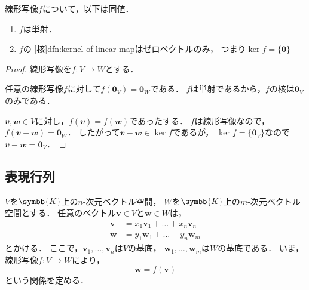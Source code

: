 \documentclass[../sotsu.tex]{subfiles}
\begin{document}
\begin{proposition}
    \label{thm:linear-map-injective}
    線形写像$f$について，以下は同値．
    \begin{enumerate}
        \item $f$は単射．
        \item $f$の-[核]{dfn:kernel-of-linear-map}はゼロベクトルのみ，
            つまり$\ker f = \{ \symbf{0} \}$
    \end{enumerate}
\end{proposition}

\begin{proof}
    線形写像を$f \colon V \to W$とする．

     \quad 
    任意の線形写像$f$に対して$f(\symbf{0}_V) = \symbf{0}_W$である．
    $f$は単射であるから，$f$の核は$\symbf{0}_V$のみである．

     \quad 
    $𝒗, 𝒘 \in V$に対し，$f(𝒗) = f(𝒘)$であったする．
    $f$は線形写像なので，$f(𝒗 - 𝒘) = \symbf{0}_W$．
    したがって$𝒗 - 𝒘 \in \ker f$であるが，
    $\ker f = \{ \symbf{0}_V \}$なので$𝒗 - 𝒘 = \symbf{0}_V$．
\end{proof}



\subsection{表現行列}
\label{representation-matrix}

$V$を$\symbb{K}$上の$n$-次元ベクトル空間，
$W$を$\symbb{K}$上の$m$-次元ベクトル空間とする．
任意のベクトル$\symbf{v} \in V$と$\symbf{w} \in W$は，
\begin{equation*}
    \begin{aligned}
        \symbf{v} &= x_1 \symbf{v}_1 + \dots + x_n \symbf{v}_n  \\
        \symbf{w} &= y_1 \symbf{w}_1 + \dots + y_n \symbf{w}_m
    \end{aligned}
\end{equation*}
とかける．
ここで，$\symbf{v}_1, \dots, \symbf{v}_n$は$V$の基底，
$\symbf{w}_1, \dots, \symbf{w}_m$は$W$の基底である．
いま，線形写像$f \colon V \to W$により，
\begin{equation*}
    \symbf{w} = f(\symbf{v})
\end{equation*}
という関係を定める．
\end{document}
